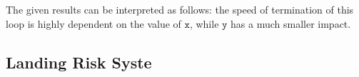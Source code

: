 The given results can be interpreted as follows: the speed of termination of this loop is highly dependent on the value of $\texttt{x}$, while $\texttt{y}$ has a much smaller impact.


\subsection{Landing Risk Syste}



